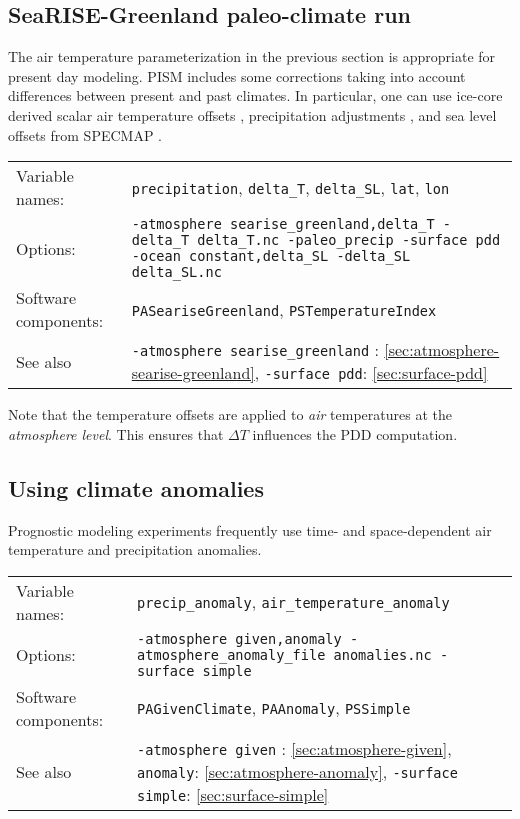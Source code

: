 \documentclass[titlepage,letterpaper,final]{scrartcl}
\begin{document}
\subsection{SeaRISE-Greenland paleo-climate run}
\label{sec:use-case-searise-greenland-paleo}

The air temperature parameterization in the previous section is appropriate for
present  day  modeling. PISM  includes  some  corrections  taking into  account
differences  between present  and past  climates.  In particular,  one can  use
ice-core  derived   scalar  air  temperature   offsets  \cite{JohnsenetalGRIP},
precipitation  adjustments  \cite{Huybrechts02},  and  sea level  offsets  from
SPECMAP \cite{Imbrieetal1984}.

\begin{center}
  \begin{tabular}{lp{}}
    \toprule
    Variable names: & \texttt{precipitation}, \texttt{delta_T}, \texttt{delta_SL}, \texttt{lat}, \texttt{lon}\\
    Options: & \texttt{-atmosphere searise_greenland,delta_T
      \mbox{-delta_T delta_T.nc}
      -paleo_precip  -surface pdd \mbox{-ocean constant,delta_SL}
      -delta_SL delta_SL.nc} \\
    Software components: & \texttt{PASeariseGreenland}, \texttt{PSTemperatureIndex} \\
    See also & \texttt{-atmosphere searise_greenland} : \ref{sec:atmosphere-searise-greenland},
    \texttt{-surface pdd}: \ref{sec:surface-pdd} \\
    \bottomrule
  \end{tabular}
\end{center}

Note that the temperature offsets are applied to \emph{air} temperatures at the
\emph{atmosphere level}. This ensures that $\Delta T$ influences the PDD
computation.

\subsection{Using climate anomalies}
\label{sec:use-case-climate-anomalies}

Prognostic modeling experiments frequently use time- and space-dependent
air temperature and precipitation anomalies.

\begin{center}
  \begin{tabular}{lp{}}
    \toprule
    Variable names: & \texttt{precip_anomaly}, \texttt{air_temperature_anomaly}\\
    Options:  &  \texttt{-atmosphere given,anomaly  -atmosphere_anomaly_file
      anomalies.nc -surface simple} \\
    Software components: & \texttt{PAGivenClimate}, \texttt{PAAnomaly}, \texttt{PSSimple}\\
    See  also   &  \texttt{-atmosphere  given}   :  \ref{sec:atmosphere-given},
    \texttt{anomaly}: \ref{sec:atmosphere-anomaly}, \texttt{-surface simple}: \ref{sec:surface-simple}\\
    \bottomrule
  \end{tabular}
\end{center}
\end{document}
